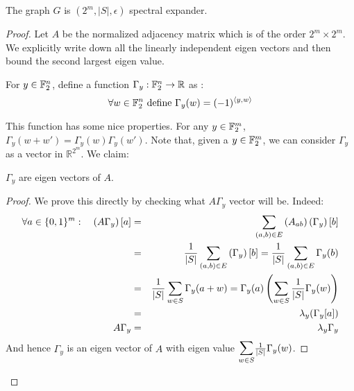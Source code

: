 \begin{lemma}
\label{lem:expanders-from-small-biased-sets}
The graph $G$ is $(2^m,|S|,\epsilon)$ spectral expander.
\end{lemma}
\begin{proof}
Let $A$ be the normalized adjacency matrix which is of the order $2^m \times 2^m$. We explicitly write down all the linearly independent eigen vectors and then bound the second largest eigen value.

For $y \in {\mathbb{F}}_2^n$, define a function $\Gamma_y : {\mathbb{F}}_2^n \to \mathbb{R}$ as : 
$$\forall w \in {\mathbb{F}}_2^n \textrm{ define } \Gamma_y(w) = (-1)^{\langle y,w \rangle}$$

This function has some nice properties. For any $y \in {\mathbb{F}}_2^m$, $\Gamma_y(w+w') = \Gamma_y(w)\Gamma_y(w')$. Note that, given a $y \in {\mathbb{F}}_2^m$, we can consider $\Gamma_y$ as a vector in $\mathbb{R}^{2^m}$. We claim:

\begin{claim}
$\Gamma_y$ are eigen vectors of $A$.
\end{claim}
\begin{proof}
We prove this directly by checking what $A\Gamma_y$ vector will be. Indeed:
\begin{eqnarray*}
\forall a \in \{0,1\}^m:~~~ \left(A\Gamma_y\right)[a] 
& = & \sum_{(a,b)\in E} \left(A_{ab}\right) \left(\Gamma_y\right)[b] \\
& = & \frac{1}{|S|} \sum_{(a,b)\in E} \left(\Gamma_y\right)[b] = \frac{1}{|S|} \sum_{(a,b) \in E} \Gamma_y(b) \\
& = & \frac{1}{|S|} \sum_{w \in S} \Gamma_y(a+w) = \Gamma_y(a) \left( \sum_{w \in S} \frac{1}{|S|}\Gamma_y(w) \right) \\
& = & \lambda_y (\Gamma_y[a]) \\
A\Gamma_y & = & \lambda_y \Gamma_y
\end{eqnarray*}
And hence $\Gamma_y$ is an eigen vector of $A$ with eigen value $\bigsum_{w \in S} \frac{1}{|S|}\Gamma_y(w)$.
\end{proof}


\end{proof}
